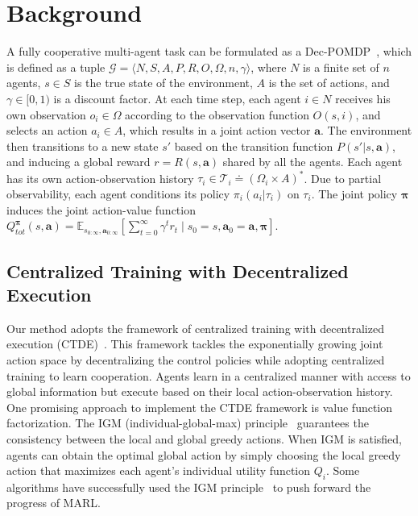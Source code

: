 \section{Background}

A fully cooperative multi-agent task can be formulated as a Dec-POMDP~\cite{oliehoek2016concise}, which is defined as a tuple $\mathcal{G}=\langle N, S, A, P, R, O, \Omega, n, \gamma\rangle$, where $N$ is a finite set of $n$ agents, $s\in S$ is the true state of the environment, $A$ is the set of actions, and $\gamma\in [0, 1)$ is a discount factor. At each time step, each agent $i\in N$ receives his own observation $o_i\in \Omega$ according to the observation function $O(s, i)$, and selects an action $a_i\in A$, which results in a joint action vector $\bm{a}$. The environment then transitions to a new state $s'$ based on the transition function $P(s'| s,\bm{a})$, and inducing a global reward $r=R(s, \bm{a})$ shared by all the agents. Each agent has its own action-observation history $\tau_i\in \mathcal{T}_i \doteq (\Omega_i\times A)^*$. Due to partial observability, each agent conditions its policy $\pi_i(a_i | \tau_i)$ on $\tau_i$. The joint policy $\bm{\pi}$ induces the joint action-value function $Q_{tot}^{\bm{\pi}}(s, \bm{a})=\mathbb{E}_{s_{0:\infty},\bm{a}_{0:\infty}}\left[\sum_{t=0}^\infty \gamma^t r_t \mid s_0=s, \bm{a}_0=\bm{a}, \bm{\pi} \right]$.

\subsection{Centralized Training with Decentralized Execution}
Our method adopts the framework of centralized training with decentralized execution (CTDE)~\cite{lowe2017multi, foerster2018counterfactual, sunehag2018value, rashid2018qmix, son2019qtran, son2020qtran, wang2020qplex, ma2021modeling}. This framework tackles the exponentially growing joint action space by decentralizing the control policies while adopting centralized training to learn cooperation. Agents learn in a centralized manner with access to global information but execute based on their local action-observation history. One promising approach to implement the CTDE framework is value function factorization. The IGM (individual-global-max) principle~\cite{son2019qtran} guarantees the consistency between the local and global greedy actions. When IGM is satisfied, agents can obtain the optimal global action by simply choosing the local greedy action that maximizes each agent's individual utility function $Q_i$. Some algorithms have successfully used the IGM principle~\cite{rashid2018qmix,wang2020qplex,rashid2020weighted} to push forward the progress of MARL.

